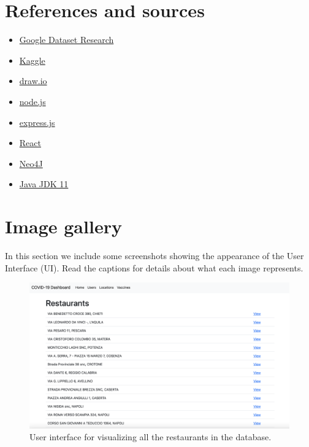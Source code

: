\documentclass{article}
\begin{document}
\section{References and sources}
\begin{itemize}
    \item \href{https://datasetsearch.research.google.com}{Google Dataset Research}
    \item \href{https://www.kaggle.com/aleanfigeno/contact-tracing-application-sample-datasets/tasks}{Kaggle}
    \item \href{https://app.diagrams.net}{draw.io}
    \item \href{https://nodejs.org}{node.js}
    \item \href{https://expressjs.com}{express.js}
    \item \href{https://reactjs.org/}{React}
    \item \href{https://neo4j.com/}{Neo4J}
    \item \href{https://www.oracle.com/it/java/technologies/javase/jdk11-archive-downloads.html}{Java JDK 11}
\end{itemize}
\section{Image gallery}
    In this section we include some screenshots showing the appearance of the User Interface (UI). Read the captions for details about what each image represents.
    
    \begin{figure}[ht!]
    \centering
    \includegraphics[scale=0.3]{smbud-contact tracing app latex code/screenshots/locationlist.png}
    \caption{User interface for visualizing all the restaurants in the database.}
\end{figure}
\end{document}
